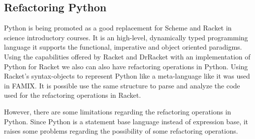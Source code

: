 \subsection{Refactoring Python}
Python is being promoted as a good replacement for Scheme and Racket in science introductory courses.
It is an high-level, dynamically typed programming language it supports the functional, imperative and object
oriented paradigms.
Using the capabilities offered by Racket and DrRacket with an implementation of Python for Racket\cite{ramos2014implementation} \cite{ramos2014reaching}
we also can also have refactoring operations in Python.
Using Racket's syntax-objects to represent Python like a meta-language like it was used in FAMIX\cite{tichelaar2000meta}.
It is possible use the same structure to parse and analyze the code used for the refactoring operations in Racket.

However, there are some limitations regarding the refactoring operations in Python.
Since Python is a statement base language instead of expression base, it raises
some problems regarding the possibility of some refactoring operations.
